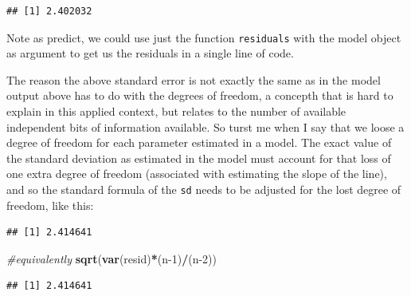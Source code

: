 \documentclass[
]{book}
\newenvironment{Shaded}{\begin{snugshade}}{\end{snugshade}}
\newcommand{\CommentTok}[1]{\textcolor[rgb]{0.56,0.35,0.01}{\textit{#1}}}
\newcommand{\DecValTok}[1]{\textcolor[rgb]{0.00,0.00,0.81}{#1}}
\newcommand{\KeywordTok}[1]{\textcolor[rgb]{0.13,0.29,0.53}{\textbf{#1}}}
\newcommand{\NormalTok}[1]{#1}
\newcommand{\OperatorTok}[1]{\textcolor[rgb]{0.81,0.36,0.00}{\textbf{#1}}}
\begin{document}
\begin{verbatim}
## [1] 2.402032
\end{verbatim}

Note as predict, we could use just the function \texttt{residuals} with the model object as argument to get us the residuals in a single line of code.

The reason the above standard error is not exactly the same as in the model output above has to do with the degrees of freedom, a concepth that is hard to explain in this applied context, but relates to the number of available independent bits of information available. So turst me when I say that we loose a degree of freedom for each parameter estimated in a model. The exact value of the standard deviation as estimated in the model must account for that loss of one extra degree of freedom (associated with estimating the slope of the line), and so the standard formula of the \texttt{sd} needs to be adjusted for the lost degree of freedom, like this:

\begin{Shaded}
\end{Shaded}

\begin{verbatim}
## [1] 2.414641
\end{verbatim}

\begin{Shaded}
\begin{Highlighting}[]
\CommentTok{#equivalently}
\KeywordTok{sqrt}\NormalTok{(}\KeywordTok{var}\NormalTok{(resid)}\OperatorTok{*}\NormalTok{(n}\DecValTok{-1}\NormalTok{)}\OperatorTok{/}\NormalTok{(n}\DecValTok{-2}\NormalTok{))}
\end{Highlighting}
\end{Shaded}

\begin{verbatim}
## [1] 2.414641
\end{verbatim}
\end{document}
